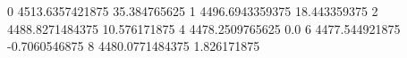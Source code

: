 0 4513.6357421875 35.384765625
1 4496.6943359375 18.443359375
2 4488.8271484375 10.576171875
4 4478.2509765625 0.0
6 4477.544921875 -0.7060546875
8 4480.0771484375 1.826171875
